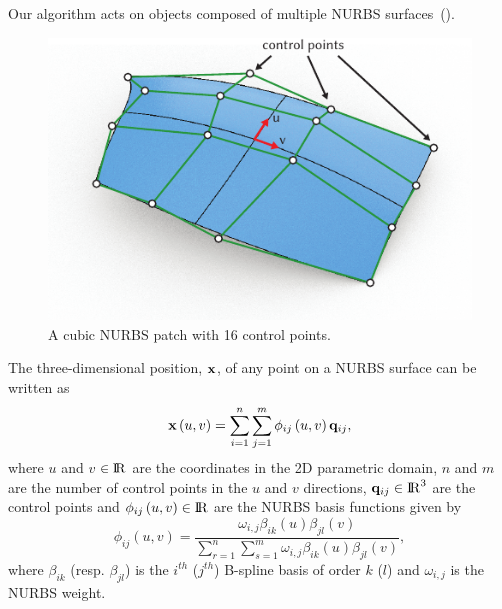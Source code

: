 Our algorithm acts on objects composed of multiple NURBS surfaces~().
\begin{figure}[h]
    \includegraphics[width=\columnwidth]{figures/nurbs_patch}
    \caption{A cubic NURBS patch with 16 control points.}
    \label{fig:NURBS}
\end{figure}
The three-dimensional position, $\mathbf{x}$, of any point on a NURBS surface can be written as 
\begin{equation}
\label{eqn:nurbs_srf}
\mathbf{x}\left(u,v\right) = \sum_{i=1}^n\sum_{j=1}^m \phi_{ij}\left(u,v\right)\mathbf{q}_{ij},
\end{equation}
where $u$ and $v$ $\in {\rm I\!R}$ are the coordinates in the 2D parametric domain, $n$ and $m$ are the number of control points in the $u$ and $v$ directions, $\mathbf{q}_{ij}\in{\rm I\!R}^3$ are the control points and $\phi_{ij}\left(u,v\right)\in{\rm I\!R}$ are the NURBS
basis functions given by 
\begin{equation*}
    \phi_{ij}\left(u,v\right) = \frac{\omega_{i,j}\beta_{ik}(u)\beta_{jl}(v)}{\sum_{r=1}^{n}\sum_{s=1}^{m} \omega_{i,j} \beta_{ik}(u)\beta_{jl}(v)},
\end{equation*} where $\beta_{ik}$ (resp. $\beta_{jl}$) is the $i^{th}$ ($j^{th}$) B-spline basis of order $k$ ($l$) and $\omega_{i,j}$ is the NURBS weight.

